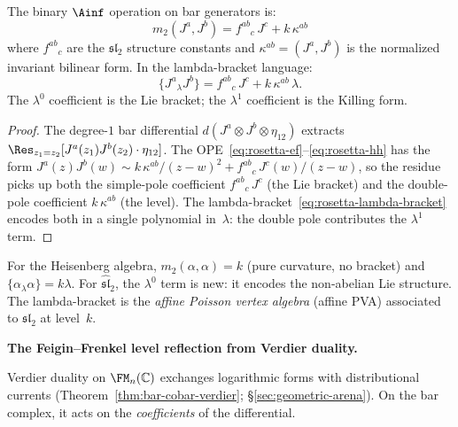 \begin{proposition}
\label{prop:rosetta-sl2-m2}
The binary $\Ainf$ operation on bar generators is:
\begin{equation}\label{eq:rosetta-m2}
m_2(J^a, J^b) = f^{ab}{}_c\, J^c + k\, \kappa^{ab}
\end{equation}
where $f^{ab}{}_c$ are the $\mathfrak{sl}_2$ structure constants and
$\kappa^{ab} = (J^a, J^b)$ is the normalized invariant bilinear form.
In the lambda-bracket language\textup{:}
\begin{equation}\label{eq:rosetta-lambda-bracket}
\{J^a {}_\lambda J^b\} = f^{ab}{}_c\, J^c + k\, \kappa^{ab}\, \lambda.
\end{equation}
The $\lambda^0$ coefficient is the Lie bracket; the $\lambda^1$
coefficient is the Killing form.
\end{proposition}

\begin{proof}
The degree-$1$ bar differential
$d(J^a \otimes J^b \otimes \eta_{12})$ extracts
$\Res_{z_1 = z_2}[J^a(z_1) J^b(z_2) \cdot \eta_{12}]$. The
OPE~\eqref{eq:rosetta-ef}--\eqref{eq:rosetta-hh} has the form
$J^a(z) J^b(w) \sim k\, \kappa^{ab}/(z-w)^2
+ f^{ab}{}_c\, J^c(w)/(z-w)$, so the residue picks up both the
simple-pole coefficient $f^{ab}{}_c\, J^c$ (the Lie bracket) and
the double-pole coefficient $k\, \kappa^{ab}$ (the level). The
lambda-bracket~\eqref{eq:rosetta-lambda-bracket} encodes both in a
single polynomial in~$\lambda$: the double pole contributes the
$\lambda^1$ term.
\end{proof}

\begin{remark}
For the Heisenberg algebra, $m_2(\alpha, \alpha) = k$ (pure
curvature, no bracket) and $\{\alpha {}_\lambda \alpha\} = k\lambda$.
For $\widehat{\mathfrak{sl}}_2$, the $\lambda^0$ term is new: it
encodes the non-abelian Lie structure. The lambda-bracket is the
\emph{affine Poisson vertex algebra} (affine PVA) associated to
$\mathfrak{sl}_2$ at level~$k$.
\end{remark}

\medskip
\noindent\textbf{The Feigin--Frenkel level reflection from Verdier duality.}

Verdier duality on $\FM_n(\mathbb{C})$ exchanges logarithmic forms
with distributional currents
(Theorem~\ref{thm:bar-cobar-verdier}; \S\ref{sec:geometric-arena}).
On the bar complex, it acts on the \emph{coefficients} of the
differential.

